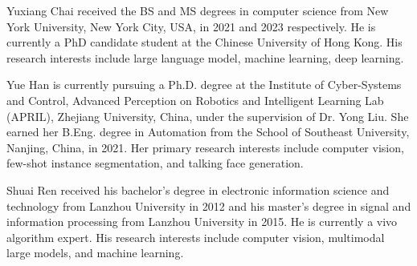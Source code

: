 \vspace{-3em}

\begin{IEEEbiography}{Yuxiang Chai}
received the BS and MS degrees in computer science from New York University, New York City, USA, in 2021 and 2023 respectively. He is currently a PhD candidate student at the Chinese University of Hong Kong. His research interests include large language model, machine learning, deep learning.
\end{IEEEbiography}

\vspace{-3em}

\begin{IEEEbiography}{Yue Han}
is currently pursuing a Ph.D. degree at the Institute of Cyber-Systems and Control, Advanced Perception on Robotics and Intelligent Learning Lab (APRIL), Zhejiang University, China, under the supervision of Dr. Yong Liu. She earned her B.Eng. degree in Automation from the School of Southeast University, Nanjing, China, in 2021. Her primary research interests include computer vision, few-shot instance segmentation, and talking face generation.
\end{IEEEbiography}

\vspace{-3em}

\begin{IEEEbiography}{Shuai Ren}
received his bachelor's degree in electronic information science and technology from Lanzhou University in 2012 and his master's degree in signal and information processing from Lanzhou University in 2015. He is currently a vivo algorithm expert. His research interests include computer vision, multimodal large models, and machine learning.
\end{IEEEbiography}

